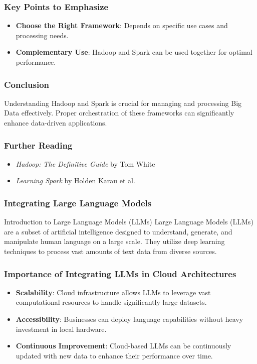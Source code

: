 \documentclass[aspectratio=169]{beamer}
\begin{document}
\begin{frame}[fragile]
    \frametitle{Key Points to Emphasize}
    \begin{itemize}
        \item \textbf{Choose the Right Framework}: Depends on specific use cases and processing needs.
        \item \textbf{Complementary Use}: Hadoop and Spark can be used together for optimal performance.
    \end{itemize}
\end{frame}

\begin{frame}[fragile]
    \frametitle{Conclusion}
    Understanding Hadoop and Spark is crucial for managing and processing Big Data effectively. Proper orchestration of these frameworks can significantly enhance data-driven applications.
\end{frame}

\begin{frame}[fragile]
    \frametitle{Further Reading}
    \begin{itemize}
        \item \textit{Hadoop: The Definitive Guide} by Tom White
        \item \textit{Learning Spark} by Holden Karau et al.
    \end{itemize}
\end{frame}

\begin{frame}[fragile]
    \frametitle{Integrating Large Language Models}
    \begin{block}{Introduction to Large Language Models (LLMs)}
        Large Language Models (LLMs) are a subset of artificial intelligence designed to understand, generate, and manipulate human language on a large scale. 
        They utilize deep learning techniques to process vast amounts of text data from diverse sources.
    \end{block}
\end{frame}

\begin{frame}[fragile]
    \frametitle{Importance of Integrating LLMs in Cloud Architectures}
    \begin{itemize}
        \item \textbf{Scalability}: Cloud infrastructure allows LLMs to leverage vast computational resources to handle significantly large datasets.
        \item \textbf{Accessibility}: Businesses can deploy language capabilities without heavy investment in local hardware.
        \item \textbf{Continuous Improvement}: Cloud-based LLMs can be continuously updated with new data to enhance their performance over time.
    \end{itemize}
\end{frame}
\end{document}
